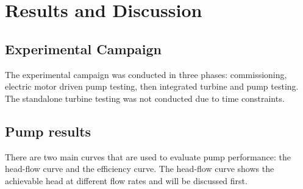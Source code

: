 \section{Results and Discussion}



\subsection{Experimental Campaign}

The experimental campaign was conducted in three phases: commissioning, electric motor driven pump testing, then integrated turbine and pump testing. The standalone turbine testing was not conducted due to time constraints.

\subsection{Pump results}

There are two main curves that are used to evaluate pump performance: the head-flow curve and the efficiency curve. The head-flow curve shows the achievable head at different flow rates and will be discussed first.




